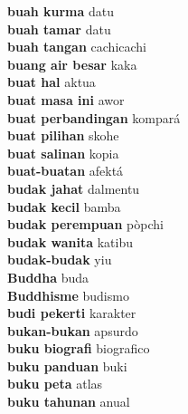 \textbf{ buah kurma  } datu \\
\textbf{ buah tamar  } datu \\
\textbf{ buah tangan  } cachicachi \\
\textbf{ buang air besar  } kaka \\
\textbf{ buat hal  } aktua \\
\textbf{ buat masa ini  } awor \\
\textbf{ buat perbandingan  } kompará \\
\textbf{ buat pilihan  } skohe \\
\textbf{ buat salinan  } kopia \\
\textbf{ buat-buatan  } afektá \\
\textbf{ budak jahat  } dalmentu \\
\textbf{ budak kecil  } bamba \\
\textbf{ budak perempuan  } pòpchi \\
\textbf{ budak wanita  } katibu \\
\textbf{ budak-budak  } yiu \\
\textbf{ Buddha  } buda \\
\textbf{ Buddhisme  } budismo \\
\textbf{ budi pekerti  } karakter \\
\textbf{ bukan-bukan  } apsurdo \\
\textbf{ buku biografi  } biografico \\
\textbf{ buku panduan  } buki \\
\textbf{ buku peta  } atlas \\
\textbf{ buku tahunan  } anual \\
